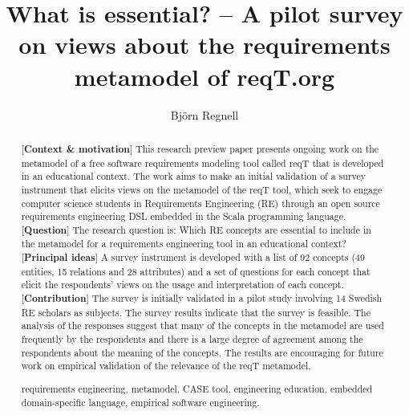 \documentclass[a4paper]{llncs}
\newcommand{\keywords}[1]{\par\addvspace\baselineskip
\noindent\keywordname\enspace\ignorespaces#1}
\begin{document}

\mainmatter  %

\title{What is essential? -- A pilot survey on views about the requirements metamodel of reqT.org}


\author{Bj\"orn Regnell}
%


\maketitle

\begin{abstract}
[{\bf Context \& motivation}] This research preview paper presents ongoing work on the metamodel of a free software requirements modeling tool called reqT that is developed in an educational context. The work aims to make an initial validation of a survey instrument that elicits views on the metamodel of the reqT tool, which seek to engage computer science students in Requirements Engineering (RE) through an open source requirements engineering DSL embedded in the Scala programming language. [{\bf Question}] The research question is: Which RE concepts are essential to include in the metamodel for a requirements engineering tool in an educational context?  [{\bf Principal ideas}] A survey instrument is developed with a list of 92 concepts (49 entities, 15 relations and 28 attributes) and a set of questions for each concept that elicit the respondents' views on the usage and interpretation of each concept.  [{\bf Contribution}] The survey is initially validated in a pilot study involving 14 Swedish RE scholars as subjects. The survey results indicate that the survey is feasible. The analysis of the responses suggest that many of the concepts in the metamodel are used frequently by the respondents and there is a large degree of agreement among the respondents about the meaning of the concepts. The results are encouraging for future work on empirical validation of the relevance of the reqT metamodel. 

\keywords{requirements engineering, metamodel, CASE tool, engineering education, embedded domain-specific language, empirical software engineering.}
\end{abstract}
\end{document}
